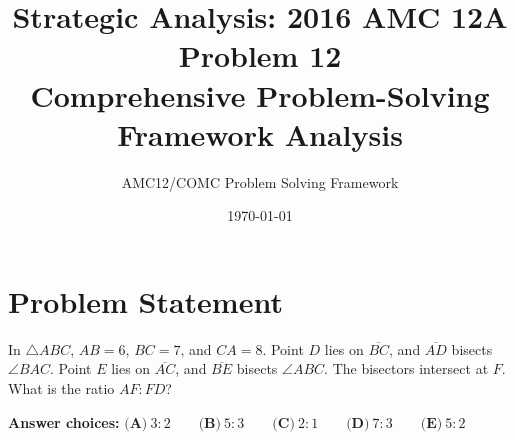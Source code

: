 \documentclass[12pt]{article}
\title{\textbf{Strategic Analysis: 2016 AMC 12A Problem 12}\\
\large Comprehensive Problem-Solving Framework Analysis}
\author{AMC12/COMC Problem Solving Framework}
\date{\today}
\begin{document}
\maketitle

\section*{Problem Statement}

In $\triangle ABC$, $AB = 6$, $BC = 7$, and $CA = 8$. Point $D$ lies on $\overline{BC}$, and $\overline{AD}$ bisects $\angle BAC$. Point $E$ lies on $\overline{AC}$, and $\overline{BE}$ bisects $\angle ABC$. The bisectors intersect at $F$. What is the ratio $AF : FD$?

\textbf{Answer choices:}
$\textbf{(A)}\ 3:2\qquad\textbf{(B)}\ 5:3\qquad\textbf{(C)}\ 2:1\qquad\textbf{(D)}\ 7:3\qquad\textbf{(E)}\ 5:2$

\vspace{0.5cm}
\end{document}
